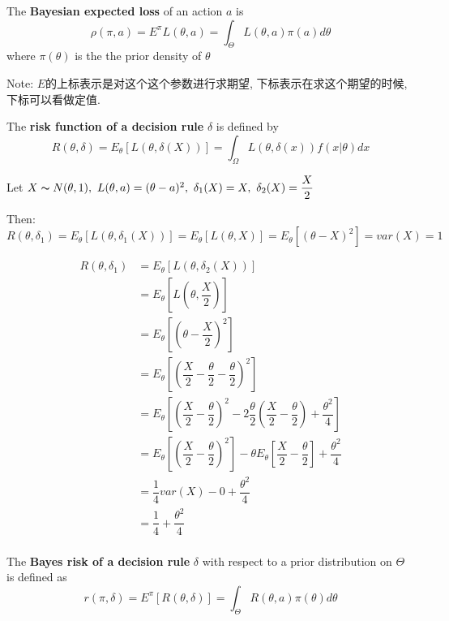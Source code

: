 \documentclass{article}
\begin{document}
\begin{definition}
The \textbf{Bayesian expected loss} of an action $a$ is
$$\rho(\pi, a) = E^\pi L(\theta, a) = \int_\Theta L(\theta, a) \pi(a)d\theta$$
where $\pi(\theta)$ is the the prior density of $\theta$
\end{definition}
Note: $E$的上标表示是对这个这个参数进行求期望, 下标表示在求这个期望的时候, 下标可以看做定值.

\begin{definition}
The \textbf{risk function of a decision rule} $\delta$ is defined by 
$$R(\theta, \delta) = E_\theta[L(\theta, \delta(X))] = \int_\Omega L(\theta, \delta(x)) f(x|\theta)dx$$
\end{definition}

\begin{example}
\label{ex.decision.risk}
Let $X \thicksim{N}(\theta, 1),\ L(\theta, a) = (\theta - a)^2,\ \delta_1(X) = X,\ \delta_2(X) = \dfrac{X}{2}$

Then:
$$R(\theta, \delta_1) = E_\theta[L(\theta,\delta_1(X))] = E_\theta[L(\theta,X)] = E_\theta[(\theta - X)^2] = var(X) = 1 $$

$$
\begin{aligned}
R(\theta, \delta_1) 
& = E_\theta[L(\theta,\delta_2(X))] \\
& = E_\theta[L(\theta, \dfrac{X}{2})] \\ 
& = E_\theta[(\theta - \dfrac{X}{2})^2] \\
& = E_\theta[(\dfrac{X}{2} - \dfrac{\theta}{2} - \dfrac{\theta}{2})^2] \\
& = E_\theta[(\dfrac{X}{2} - \dfrac{\theta}{2})^2 - 2 \dfrac{\theta}{2}(\dfrac{X}{2} - \dfrac{\theta}{2}) + \dfrac{\theta^2}{4}] \\
& = E_\theta[(\dfrac{X}{2} - \dfrac{\theta}{2})^2] - \theta E_\theta[\dfrac{X}{2} - \dfrac{\theta}{2}] + \dfrac{\theta^2}{4} \\
& = \dfrac{1}{4} var(X) - 0 + \dfrac{\theta^2}{4} \\
& = \dfrac{1}{4} + \dfrac{\theta^2}{4} \\
\end{aligned}
$$
\end{example}
\begin{definition}
The \textbf{Bayes risk of a decision rule} $\delta$ with respect to a prior distribution on $\Theta$ is defined as 
$$r(\pi, \delta) = E^\pi[R(\theta, \delta)] = \int_\Theta R(\theta, a) \pi(\theta) d\theta$$
\end{definition}
\end{document}

